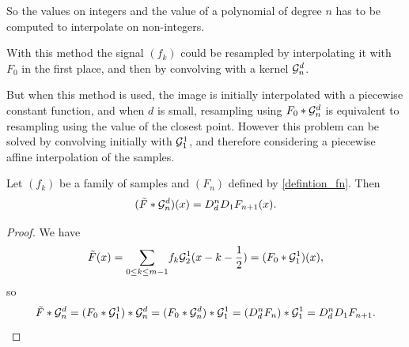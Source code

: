 

\noindent So the values on integers and the value of a polynomial of degree $n$ has to be computed to interpolate on non-integers.

\medbreak
With this method the signal $(f_k)$ could be resampled by interpolating it with $F_{0}$ in the first place, and then by convolving with a kernel $\mathcal{G}_n^d$.

\noindent But when this method is used, the image is initially interpolated with a piecewise constant function, and when $d$ is small, resampling using $F_{0}*\mathcal{G}_n^d$ is equivalent to resampling using the value of the closest point. However this problem can be solved by convolving initially with $\mathcal{G}_1^1$, and therefore considering a piecewise affine interpolation of the samples.




\begin{prop}
Let $(f_k)$ be a family of samples and $(F_n)$ defined by \eqref{defintion_fn}. Then
\begin{equation*}
( \tilde{F} * \mathcal{G}_n^d ) (x) = D_d^{n}D_1 F_{n+1}(x).
\end{equation*}
\end{prop}

\begin{proof}
We have
\begin{equation*}
\tilde{F}(x)=\displaystyle{\sum_{0\le k \le m-1}} f_k \mathcal{G}_2^1 (x-k-\frac{1}{2})=(F_{0} *\mathcal{G}_1^1 )(x),
\end{equation*}
so
\begin{equation*}
\tilde{F}*\mathcal{G}_n^d=(F_{0}*\mathcal{G}_1^1)*\mathcal{G}_n^d=(F_{0}*\mathcal{G}_n^d)*\mathcal{G}_1^1=(D_d^n F_{n})*\mathcal{G}_1^1= D_d^n D_1 F_{n+1}.
\end{equation*}
\end{proof}


